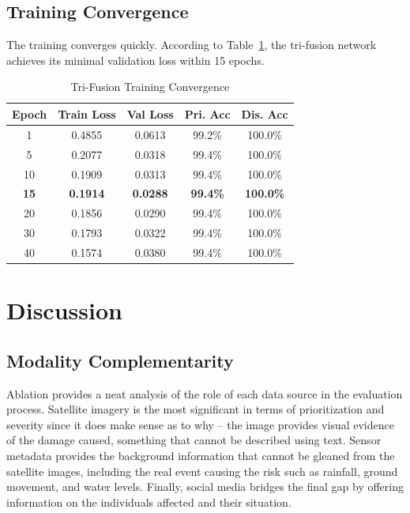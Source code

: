 \documentclass[journal]{IEEEtran}
\begin{document}
\subsection{Training Convergence}

The training converges quickly. According to Table~\ref{tab:convergence}, the tri-fusion network achieves its minimal validation loss within 15 epochs.

\begin{table}[!t]
\centering
\caption{Tri-Fusion Training Convergence}
\label{tab:convergence}
\begin{tabular}{ccccc}
\toprule
\textbf{Epoch} & \textbf{Train Loss} & \textbf{Val Loss} & \textbf{Pri. Acc} & \textbf{Dis. Acc} \\
\midrule
1  & 0.4855 & 0.0613 & 99.2\% & 100.0\% \\
5  & 0.2077 & 0.0318 & 99.4\% & 100.0\% \\
10 & 0.1909 & 0.0313 & 99.4\% & 100.0\% \\
\textbf{15} & \textbf{0.1914} & \textbf{0.0288} & \textbf{99.4\%} & \textbf{100.0\%} \\
20 & 0.1856 & 0.0290 & 99.4\% & 100.0\% \\
30 & 0.1793 & 0.0322 & 99.4\% & 100.0\% \\
40 & 0.1574 & 0.0380 & 99.4\% & 100.0\% \\
\bottomrule
\end{tabular}
\end{table}

\section{Discussion}

\subsection{Modality Complementarity}

Ablation provides a neat analysis of the role of each data source in the evaluation process. Satellite imagery is the most significant in terms of prioritization and severity since it does make sense as to why -- the image provides visual evidence of the damage caused, something that cannot be described using text. Sensor metadata provides the background information that cannot be gleaned from the satellite images, including the real event causing the risk such as rainfall, ground movement, and water levels. Finally, social media bridges the final gap by offering information on the individuals affected and their situation.
\end{document}
